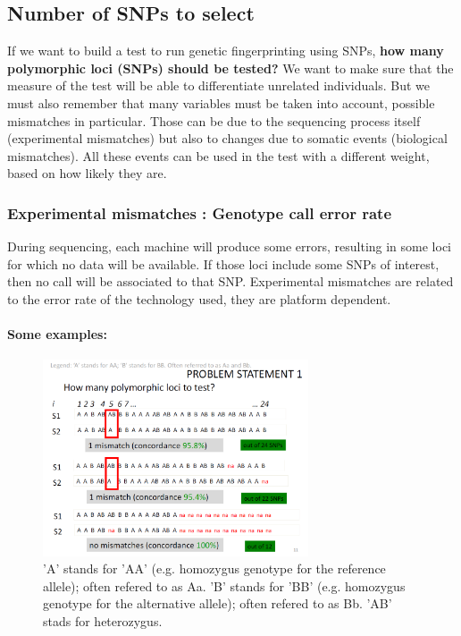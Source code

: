 \subsection{Number of SNPs to select} 

If we want to build a test to run genetic fingerprinting using SNPs, \textbf{how
many polymorphic loci (SNPs) should be tested?} We want to make sure that the
measure of the test will be able to differentiate unrelated individuals. But we
must also remember that many variables must be taken into account, possible
mismatches in particular. Those can be due to the sequencing process itself
(experimental mismatches) but also to changes due to somatic events (biological
mismatches). All these events can be used in the test with a different weight,
based on how likely they are. 


\subsubsection{Experimental mismatches : Genotype call error rate}

During sequencing, each machine will produce some errors, resulting in some loci
for which no data will be available. If those loci include some SNPs of
interest, then no call will be associated to that SNP. Experimental mismatches
are related to the error rate of the technology used, they are platform
dependent. 

\paragraph{Some examples:}

\begin{figure}[ht]
	\centering
	\includegraphics[width=0.7\textwidth]{SNP_number.PNG}
	\caption{'A' stands for 'AA' (e.g. homozygus genotype for the reference
	allele); often refered to as Aa. 'B' stands for 'BB' (e.g. homozygus
	genotype for the alternative allele); often refered to as Bb. 'AB' stads for
	heterozygus.}
	\label{fig:SNP_number}  
\end{figure}

